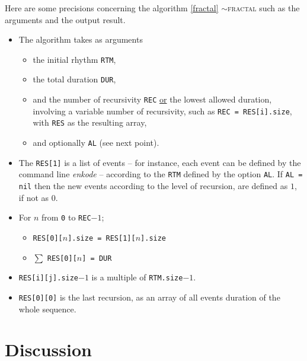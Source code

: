   \smallskip
 Here are some precisions concerning the algorithm \ref{fractal} $\sim$\textsc{fractal} such as the arguments and the output result.
 
\begin{itemize}[label=\textbullet]
\item The algorithm takes as arguments
\begin{itemize}[label=$\rightarrow$]
\item  the initial rhythm \texttt{RTM}, 
 \item the total duration \texttt{DUR},
 \item  and the number of recursivity \texttt{REC} \underline{or} the \hbox{lowest} allowed duration, involving a variable number of recursivity, such as \texttt{REC = RES[i].size}, with \texttt{RES} as the resulting array, 
 \item and optionally \texttt{AL} (see next point). 
 \end{itemize}
\item The \texttt{RES[1]} is a list of events -- for instance, each event can be defined by the command line \textsl{enkode}
 -- according to the \texttt{RTM} defined by the option \texttt{AL}. If \texttt{AL = nil} then the new events according to the level of recursion, are defined as $1$, if not as $0$.
\item For $n$ from \texttt{0} to \texttt{REC$-1$};
\begin{itemize}[label=$\rightarrow$]
\item \texttt{RES[0][$n$].size = RES[1][$n$].size}
\item $\sum$ \texttt{RES[0][}$n$\texttt{] =  DUR}
\end{itemize}
\item \texttt{RES[i][j].size$-1$} is a multiple of \texttt{RTM.size$-1$}.

\item \texttt{RES[0][0]} is the last recursion, as an array of all events duration of the whole sequence.

\end{itemize}

\section{Discussion}
\label{Discussion}

